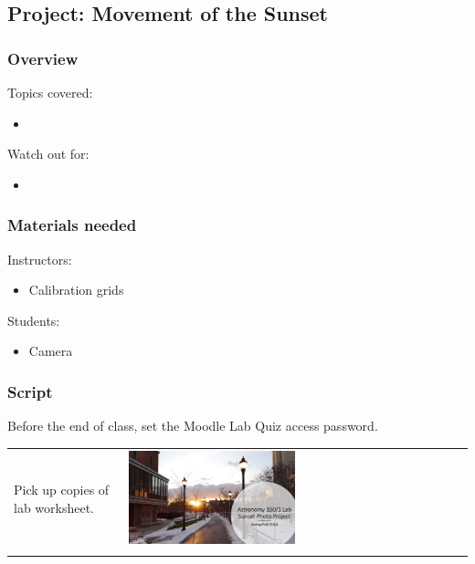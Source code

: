 \documentclass[12pt]{article}
\begin{document}
\newpage
\subsection{Project: Movement of the Sunset}

\subsubsection{Overview}

Topics covered:
\begin{itemize}
\item 
\end{itemize}

\noindent
Watch out for:
\begin{itemize}
\item 
\end{itemize}


\subsubsection{Materials needed}

Instructors:
\begin{itemize}
\item Calibration grids
\end{itemize}

\noindent
Students:
\begin{itemize}
\item Camera
\end{itemize}


\subsubsection{Script}

Before the end of class, set the Moodle Lab Quiz access password.

\begin{longtable}{m{}m{}}
Pick up copies of lab worksheet. & \includegraphics[width=0.5\textwidth]{ppt/proj/Slide1.jpeg}\\

\label{default}
\end{longtable}
\end{document}
